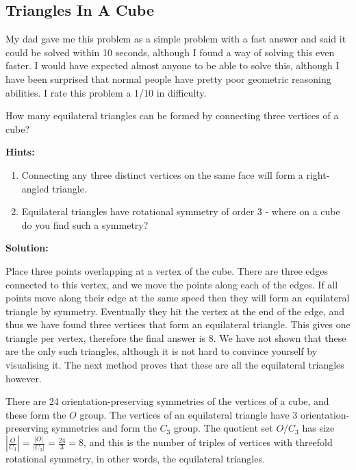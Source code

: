 \subsection{Triangles In A Cube}

My dad gave me this problem as a simple problem with a fast answer and said it could be solved within 10 seconds, although I found a way of solving this even faster. I would have expected almost anyone to be able to solve this, although I have been surprised that normal people have pretty poor geometric reasoning abilities. I rate this problem a 1/10 in difficulty.

How many equilateral triangles can be formed by connecting three vertices of a cube?

\textbf{Hints:}

\begin{enumerate}
	\item Connecting any three distinct vertices on the same face will form a right-angled triangle.
	\item Equilateral triangles have rotational symmetry of order 3 - where on a cube do you find such a symmetry?
\end{enumerate}

\textbf{Solution:}

Place three points overlapping at a vertex of the cube. There are three edges connected to this vertex, and we move the points along each of the edges. If all points move along their edge at the same speed then they will form an equilateral triangle by symmetry. Eventually they hit the vertex at the end of the edge, and thus we have found three vertices that form an equilateral triangle. This gives one triangle per vertex, therefore the final answer is 8. We have not shown that these are the only such triangles, although it is not hard to convince yourself by visualising it. The next method proves that these are all the equilateral triangles however.

There are 24 orientation-preserving symmetries of the vertices of a cube, and these form the $O$ group. The vertices of an equilateral triangle have 3 orientation-preserving symmetries and form the $C_3$ group. The quotient set $O/C_3$ has size $\left| \frac{O}{C_3} \right| = \frac{|O|}{|C_3|} = \frac{24}{3} = 8$, and this is the number of triples of vertices with threefold rotational symmetry, in other words, the equilateral triangles.

